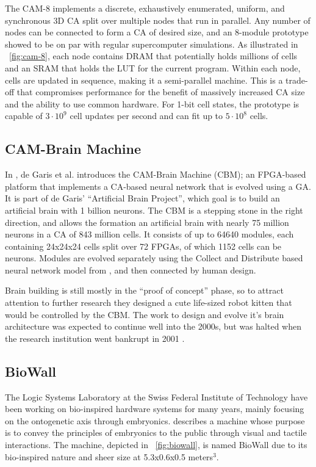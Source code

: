 The CAM-8 implements a discrete, exhaustively enumerated, uniform, and synchronous 3D CA split over multiple nodes that run in parallel.
Any number of nodes can be connected to form a CA of desired size, and an 8-module prototype showed to be on par with regular supercomputer simulations.
As illustrated in \figurename~\ref{fig:cam-8}, each node contains DRAM that potentially holds millions of cells and an SRAM that holds the LUT for the current program.
Within each node, cells are updated in sequence, making it a semi-parallel machine.
This is a trade-off that compromises performance for the benefit of massively increased CA size and the ability to use common hardware.
For 1-bit cell states, the prototype is capable of $3 \cdot 10^9$ cell updates per second and can fit up to $5 \cdot 10^8$ cells.

\subsection{CAM-Brain Machine}

In \cite{degaris2001cbm}, de Garis et al. introduces the CAM-Brain Machine (CBM); an FPGA-based platform that implements a CA-based neural network that is evolved using a GA.
It is part of de Garis' ``Artificial Brain Project'', which goal is to build an artificial brain with 1 billion neurons.
The CBM is a stepping stone in the right direction, and allows the formation an artificial brain with nearly 75 million neurons in a CA of 843 million cells.
It consists of up to 64640 modules, each containing 24x24x24 cells split over 72 FPGAs, of which 1152 cells can be neurons.
Modules are evolved separately using the Collect and Distribute based neural network model from \cite{gers1998codi}, and then connected by human design.

Brain building is still mostly in the ``proof of concept'' phase, so to attract attention to further research they designed a cute life-sized robot kitten that would be controlled by the CBM.
The work to design and evolve it's brain architecture was expected to continue well into the 2000s, but was halted when the research institution went bankrupt in 2001 \cite{giles2001utopian}.

\subsection{BioWall}

The Logic Systems Laboratory at the Swiss Federal Institute of Technology have been working on bio-inspired hardware systems for many years, mainly focusing on the ontogenetic axis through embryonics.
\cite{tempesti2002biowall} describes a machine whose purpose is to convey the principles of embryonics to the public through visual and tactile interactions.
The machine, depicted in \figurename~\ref{fig:biowall}, is named BioWall due to its bio-inspired nature and sheer size at 5.3x0.6x0.5 meters${}^3$.

